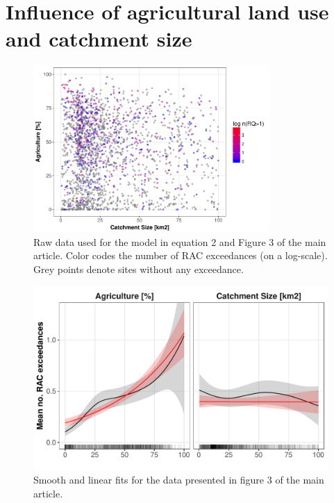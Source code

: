 \documentclass[pdftex,
	a4paper,
	titlepage=false]{scrreprt}
\begin{document}
\chapter{Influence of agricultural land use and catchment size}
\begin{figure}[ht]
	\centering
	\includegraphics[width = 0.8\textwidth]{ezgagrirac}
	\caption[Raw data used for the model in equation 2 and Figure 3 of the main article.]{Raw data used for the model in equation 2 and Figure 3 of the main article. Color codes the number of RAC exceedances (on a log-scale). Grey points denote sites without any exceedance.}
	\label{fig:ezgagrirac}
\end{figure}


\begin{figure}[ht]
	\centering
	\includegraphics[width = \textwidth]{smooth_lin.pdf}
	\caption[Smooth and linear fit]{Smooth and linear fits for the data presented in figure 3 of the main article.}
	\label{fig:smooth_lin}
\end{figure}
\end{document}
